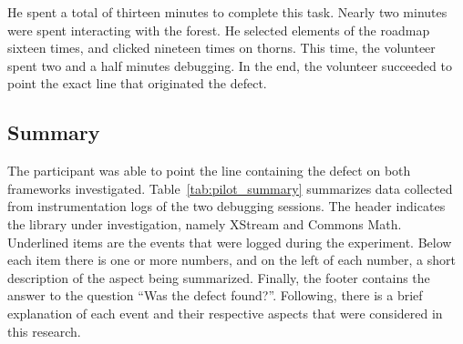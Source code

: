 He spent a total of thirteen minutes to complete this task. Nearly two minutes
were spent interacting with the forest. He selected elements of the roadmap
sixteen times, and clicked nineteen times on thorns. This time, the volunteer
spent two and a half minutes debugging. In the end, the volunteer succeeded to
point the exact line that originated the defect.

\subsection{Summary}

The participant was able to point the line containing the defect on both
frameworks investigated. Table~\ref{tab:pilot_summary} summarizes data collected
from instrumentation logs of the two debugging sessions.
The header indicates the library under investigation, namely XStream and Commons
Math. Underlined items are the events that were logged during the experiment.
Below each item there is one or more numbers, and on the left of each number, a
short description of the aspect being summarized. Finally, the footer contains
the answer to the question ``Was the defect found?''. Following, there is a
brief explanation of each event and their respective aspects that were
considered in this research.

